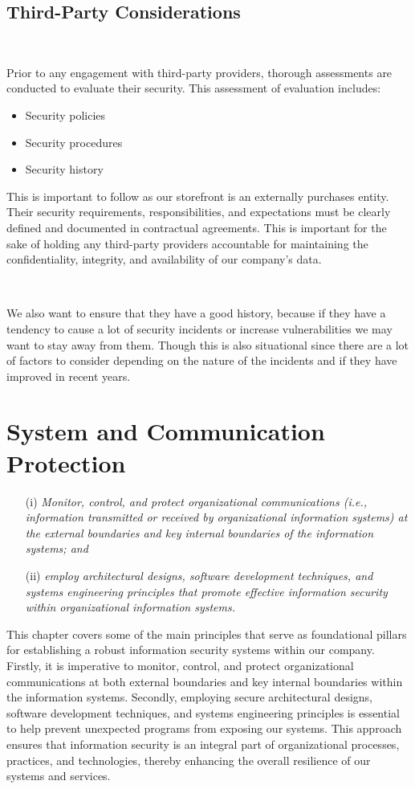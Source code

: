 \documentclass[12pt,a4paper]{report}
\begin{document}
\section{Third-Party Considerations}
\

Prior to any engagement with third-party providers, thorough assessments are conducted to evaluate their security.
This assessment of evaluation includes:
\begin{itemize}
 \item Security policies
 \item Security procedures
 \item Security history
\end{itemize}

This is important to follow as our storefront is an externally purchases entity.
Their security requirements, responsibilities, and expectations must be clearly defined and documented in contractual agreements.
This is important for the sake of holding any third-party providers accountable for maintaining the confidentiality, integrity, and availability of our company's data.

\

We also want to ensure that they have a good history, because if they have a tendency to cause a lot of security incidents or increase vulnerabilities we may want to stay away from them.
Though this is also situational since there are a lot of factors to consider depending on the nature of the incidents and if they have improved in recent years.

\chapter{System and Communication Protection}
\begin{enumerate}
 \item[(i)]	\textit{Monitor, control, and protect organizational communications (i.e., information transmitted or received by organizational information systems) at the external boundaries and key internal boundaries of the information systems; and}
 \item[(ii)] \textit{employ architectural designs, software development techniques, and systems engineering principles that promote effective information security within organizational information systems.}
\end{enumerate}


This chapter covers some of the main principles that serve as foundational pillars for establishing a robust information security systems within our company.
Firstly, it is imperative to monitor, control, and protect organizational communications at both external boundaries and key internal boundaries within the information systems.
Secondly, employing secure architectural designs, software development techniques, and systems engineering principles is essential to help prevent unexpected programs from exposing our systems.
This approach ensures that information security is an integral part of organizational processes, practices, and technologies, thereby enhancing the overall resilience of our systems and services.
\end{document}

